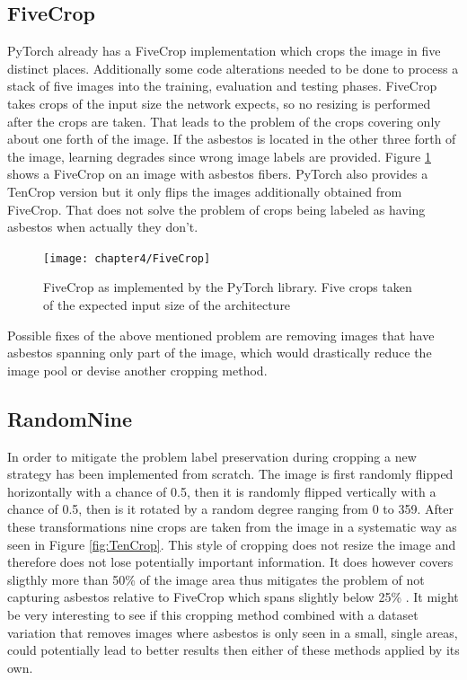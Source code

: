 \subsection{FiveCrop}

PyTorch already has a FiveCrop implementation which crops the image in five distinct places. Additionally some code alterations needed to be done to process a stack of five images into the training, evaluation and testing phases. FiveCrop takes crops of the input size the network expects, so no resizing is performed after the crops are taken. That leads to the problem of the crops covering only about one forth of the image. If the asbestos is located in the other three forth of the image, learning degrades since wrong image labels are provided. Figure \ref{fig:FiveCrop} shows a FiveCrop on an image with asbestos fibers. PyTorch also provides a TenCrop version but it only flips the images additionally obtained from FiveCrop. That does not solve the problem of crops being labeled as having asbestos when actually they don't.

\begin{figure}[!h]
  \centering
  \caption{FiveCrop as implemented by the PyTorch library. Five crops taken of the expected input size of the architecture}
  \texttt{[image: chapter4/FiveCrop]}
  \label{fig:FiveCrop}
\end{figure}

Possible fixes of the above mentioned problem are removing images that have asbestos spanning only part of the image, which would drastically reduce the image pool or devise another cropping method.

\subsection{RandomNine}

In order to mitigate the problem label preservation during cropping a new strategy has been implemented from scratch. The image is first randomly flipped horizontally with  a chance of 0.5, then it is randomly  flipped vertically with a chance of 0.5, then is it rotated by a random degree ranging from 0 to 359. After these transformations nine crops are taken from the image in a systematic way as seen in Figure \ref{fig:TenCrop}. This style of cropping does not resize the image and therefore does not lose potentially important information. It does however covers sligthly more than 50\% of the image area thus mitigates the problem of not capturing asbestos relative to FiveCrop which spans slightly below 25\% . It might be very interesting to see if this cropping method combined with a dataset variation that removes images where asbestos is only seen in a small, single areas, could potentially lead to better results then either of these methods applied by its own.


